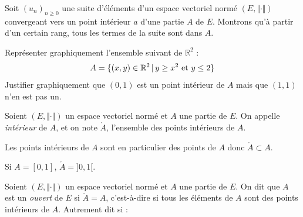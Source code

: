 \documentclass[french,11pt,twoside]{VcCours}
\begin{document}
\begin{Exemple} Soit $(u_n)_{n \geq 0}$ une suite d'éléments d'un espace vectoriel normé $(E, \Vert \cdot \Vert)$ convergeant vers un point intérieur $a$ d'une partie $A$ de $E$. Montrons qu'à partir d'un certain rang, tous les termes de la suite sont dans $A$.


\vspace*{3cm}
%
\end{Exemple}

\begin{ApplicationDirecte}{} Représenter graphiquement l'ensemble suivant de $\mathbb{R}^2$ :
$$ A= \lbrace (x,y) \in \mathbb{R}^2 \, \vert \,  y \geq x^2 \hbox{ et } y \leq 2 \rbrace$$
Justifier graphiquement que $(0,1)$ est un point intérieur de $A$ mais que $(1,1)$ n'en est pas un.
\end{ApplicationDirecte}

\begin{Definition}{} Soient $(E, \Vert \cdot \Vert)$ un espace vectoriel normé et $A$ une partie de $E$. On appelle \emph{intérieur} de $A$, et on note $\mathring{A}$, l'ensemble des points intérieurs de $A$.
\end{Definition}

\begin{Remarque}{} Les points intérieurs de $A$ sont en particulier des points de $A$ donc $\mathring{A} \subset A$.
\end{Remarque}

\begin{Exemple} Si $A=[0,1]$, $\mathring{A} = ]0,1[$.
\end{Exemple}

\begin{Definition}{}
Soient $(E, \Vert \cdot \Vert)$ un espace vectoriel normé et $A$ une partie de $E$. On dit que $A$ est un \emph{ouvert} de $E$ si $\mathring{A}=A$, c'est-à-dire si tous les éléments de $A$ sont des points intérieurs de $A$. Autrement dit si :
$$ \phantom{\forall a \in A, \, \exists r>0 \, \vert \, B(a,r) \subset A}$$
\end{Definition}
%
\end{document}
